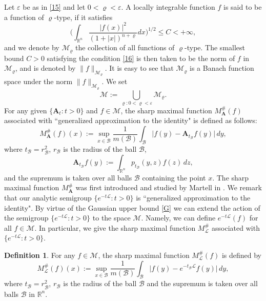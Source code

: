 \documentclass[10pt, reqno]{amsart}
\theoremstyle{definition}
\newtheorem{definition}[theorem]{Definition}
\theoremstyle{remark}
\numberwithin{equation}{section}
\begin{document}
Let $\varepsilon$ be as in \eqref{15} and let $0<\varrho<\varepsilon$. A locally integrable function $f$ is said to be a function of $\varrho$-type, if it satisfies
\begin{equation}\label{16}
\bigg(\int_{\mathbb R^n}\frac{|f(x)|^2}{(1+|x|)^{n+\varrho}}dx\bigg)^{1/2}\leq C<+\infty,
\end{equation}
and we denote by $\mathcal{M}_{\varrho}$ the collection of all functions of $\varrho$-type. The smallest bound $C>0$ satisfying the condition \eqref{16} is then taken to be the norm of $f$ in $\mathcal{M}_{\varrho}$, and is denoted by $\|f\|_{\mathcal{M}_{\varrho}}$. It is easy to see that $\mathcal{M}_{\varrho}$ is a Banach function space under the norm $\|f\|_{\mathcal{M}_{\varrho}}$. We set
\begin{equation*}
\mathcal{M}:=\bigcup_{\varrho:0<\varrho<\varepsilon}\mathcal{M}_{\varrho}.
\end{equation*}
For any given $\{\mathbf{A}_t:t>0\}$ and $f\in \mathcal{M}$, the sharp maximal function $M^{\#}_{\mathbf{A}}(f)$ associated with ``generalized approximation to the identity" is defined as follows:
\begin{equation*}
M^{\#}_{\mathbf{A}}(f)(x):=\sup_{x\in \mathcal{B}}\frac{1}{m(\mathcal{B})}
\int_{\mathcal{B}}\big|f(y)-\mathbf{A}_{t_{\mathcal{B}}}f(y)\big|\,dy,
\end{equation*}
where $t_{\mathcal{B}}=r_{\mathcal{B}}^2$, $r_{\mathcal{B}}$ is the radius of the ball $\mathcal{B}$,
\begin{equation*}
\mathbf{A}_{t_{\mathcal{B}}}f(y):=\int_{\mathbb R^n}p_{t_{\mathcal{B}}}(y,z)f(z)\,dz,
\end{equation*}
and the supremum is taken over all balls $\mathcal{B}$ containing the point $x$. The sharp maximal function $M^{\#}_{\mathbf{A}}$ was first introduced and studied by Martell in \cite{martell}. We remark that our analytic semigroup $\big\{e^{-t\mathcal L}:t>0\big\}$ is ``generalized approximation to the identity". By virtue of the Gaussian upper bound \eqref{G} we can extend the action of the semigroup $\big\{e^{-t\mathcal L}:t>0\big\}$ to the space $\mathcal{M}$. Namely, we can define $e^{-t\mathcal L}(f)$ for all $f\in \mathcal{M}$. In particular, we give the sharp maximal function $M^{\#}_{\mathcal{L}}$ associated with $\big\{e^{-t\mathcal L}:t>0\big\}$.
\begin{definition}\label{martel}
For any $f\in \mathcal{M}$, the sharp maximal function $M^{\#}_{\mathcal{L}}(f)$ is defined by
\begin{equation*}
M^{\#}_{\mathcal{L}}(f)(x):=\sup_{x\in \mathcal{B}}\frac{1}{m(\mathcal{B})}
\int_{\mathcal{B}}\big|f(y)-e^{-t_{\mathcal{B}}\mathcal{L}}f(y)\big|\,dy,
\end{equation*}
where $t_{\mathcal{B}}=r_{\mathcal{B}}^2$, $r_{\mathcal{B}}$ is the radius of the ball $\mathcal{B}$ and the supremum is taken over all balls $\mathcal{B}$ in $\mathbb R^n$.
\end{definition}
\end{document}
